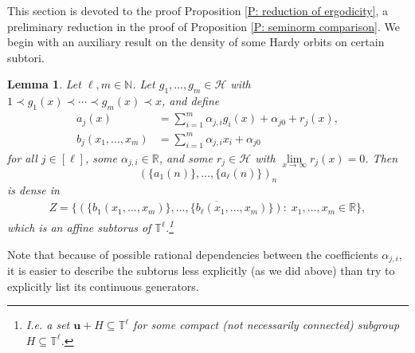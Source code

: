 \documentclass[11pt]{amsart}
\newtheorem{lemma}{Lemma}[section]
\theoremstyle{definition}
\newcommand{\N}{{\mathbb N}}
\newcommand{\R}{{\mathbb R}}
\newcommand{\T}{{\mathbb T}}
\newcommand{\CH}{{\mathcal H}}
\newcommand{\bu}{{\mathbf{u}}}
\newcommand{\1}{{\mathbf{1}}}
\begin{document}
This section is devoted to the proof Proposition \ref{P: reduction of ergodicity}, a preliminary reduction in the proof of Proposition \ref{P: seminorm comparison}. We begin with an auxiliary result on the density of some Hardy orbits on certain subtori.
\begin{lemma}\label{L: density}
    Let $\ell, m\in\N$. Let $g_1, \ldots, g_m\in \CH$ with $1\prec g_1(x)\prec \cdots \prec g_m(x)\prec x$, and define
    \begin{align*}
        a_j(x) &= \sum_{i=1}^m \alpha_{j,i}g_i(x) + \alpha_{j0}+r_j(x),\\ %
        b_j(x_1, \ldots, x_m) &= \sum_{i=1}^m \alpha_{j,i}x_i + \alpha_{j0}
    \end{align*}
    for all $j\in[\ell]$, some $\alpha_{j,i}\in\R$, and some $r_j\in\CH$ with $\lim\limits_{x\to\infty}r_j(x)=0$.
    Then $$(\{a_1(n)\}, \ldots, \{a_\ell(n)\})_n$$ is dense in
    \begin{align*}
        Z = \overline{\{(\{b_1(x_1, \ldots, x_m)\}, \ldots, \{b_\ell(x_1, \ldots, x_m)\}):\; x_1, \ldots, x_m\in\R\}},
    \end{align*}
    which is an affine subtorus of $\T^\ell$.\footnote{I.e. a set $\bu + H\subseteq \T^\ell$ for some compact (not necessarily connected) subgroup $H\subseteq \T^\ell$.}
\end{lemma}
Note that because of possible rational dependencies between the coefficients $\alpha_{j,i}$, it is easier to describe the subtorus less explicitly (as we did above) than try to explicitly list its continuous generators.
\end{document}
